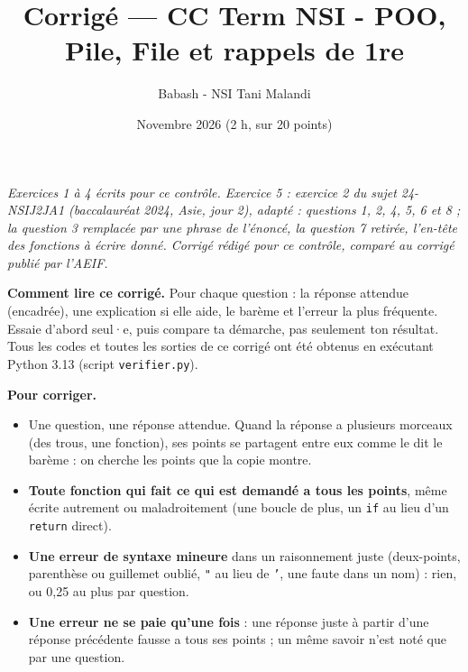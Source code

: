 \documentclass[11pt, a4paper]{exam}
\title{Corrigé — CC Term NSI - POO, Pile, File et rappels de 1re}
\author{Babash - NSI Tani Malandi}
\date{Novembre 2026 (2 h, sur 20 points)}
\newcommand{\code}[1]{\texttt{#1}}
\begin{document}
\pagestyle{headandfoot}
\firstpageheader{}{}{}
\runningheadrule
{}

\maketitle
\thispagestyle{headandfoot}
\begin{center}\footnotesize\itshape Exercices 1 à 4 écrits pour ce contrôle. Exercice 5 : exercice 2 du sujet 24-NSIJ2JA1 (baccalauréat 2024, Asie, jour 2), adapté : questions 1, 2, 4, 5, 6 et 8 ; la question 3 remplacée par une phrase de l'énoncé, la question 7 retirée, l'en-tête des fonctions à écrire donné. Corrigé rédigé pour ce contrôle, comparé au corrigé publié par l'AEIF.\end{center}

\begin{tcolorbox}[colback=white, colframe=black, boxrule=0.5pt, arc=1mm, left=2mm, right=2mm]
\small\textbf{Comment lire ce corrigé.} Pour chaque question : la réponse attendue (encadrée), une explication si elle aide, le barème et l'erreur la plus fréquente. Essaie d'abord seul·e, puis compare ta démarche, pas seulement ton résultat. Tous les codes et toutes les sorties de ce corrigé ont été obtenus en exécutant Python 3.13 (script \code{verifier.py}).

\textbf{Pour corriger.}
\begin{itemize}[leftmargin=1.2em, itemsep=1pt, topsep=2pt]
\item Une question, une réponse attendue. Quand la réponse a plusieurs morceaux (des trous, une fonction), ses points se partagent entre eux comme le dit le barème : on cherche les points que la copie montre.
\item \textbf{Toute fonction qui fait ce qui est demandé a tous les points}, même écrite autrement ou maladroitement (une boucle de plus, un \code{if} au lieu d'un \code{return} direct).
\item \textbf{Une erreur de syntaxe mineure} dans un raisonnement juste (deux-points, parenthèse ou guillemet oublié, \code{"} au lieu de \code{'}, une faute dans un nom) : rien, ou 0,25 au plus par question.
\item \textbf{Une erreur ne se paie qu'une fois} : une réponse juste à partir d'une réponse précédente fausse a tous ses points ; un même savoir n'est noté que par une question.
\end{itemize}
\end{tcolorbox}
\end{document}
